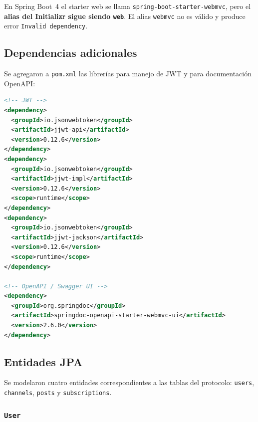 \begin{aviso}
En Spring Boot~4 el starter web se llama \texttt{spring-boot-starter-webmvc}, pero el \textbf{alias del Initializr sigue siendo \texttt{web}}. El alias \texttt{webmvc} no es válido y produce error \texttt{Invalid dependency}.
\end{aviso}

\subsection{Dependencias adicionales}

Se agregaron a \texttt{pom.xml} las librerías para manejo de JWT y para documentación OpenAPI:

\begin{lstlisting}[language=xml]
<!-- JWT -->
<dependency>
  <groupId>io.jsonwebtoken</groupId>
  <artifactId>jjwt-api</artifactId>
  <version>0.12.6</version>
</dependency>
<dependency>
  <groupId>io.jsonwebtoken</groupId>
  <artifactId>jjwt-impl</artifactId>
  <version>0.12.6</version>
  <scope>runtime</scope>
</dependency>
<dependency>
  <groupId>io.jsonwebtoken</groupId>
  <artifactId>jjwt-jackson</artifactId>
  <version>0.12.6</version>
  <scope>runtime</scope>
</dependency>

<!-- OpenAPI / Swagger UI -->
<dependency>
  <groupId>org.springdoc</groupId>
  <artifactId>springdoc-openapi-starter-webmvc-ui</artifactId>
  <version>2.6.0</version>
</dependency>
\end{lstlisting}

\subsection{Entidades JPA}

Se modelaron cuatro entidades correspondientes a las tablas del protocolo: \texttt{users}, \texttt{channels}, \texttt{posts} y \texttt{subscriptions}.

\subsubsection{\texttt{User}}

